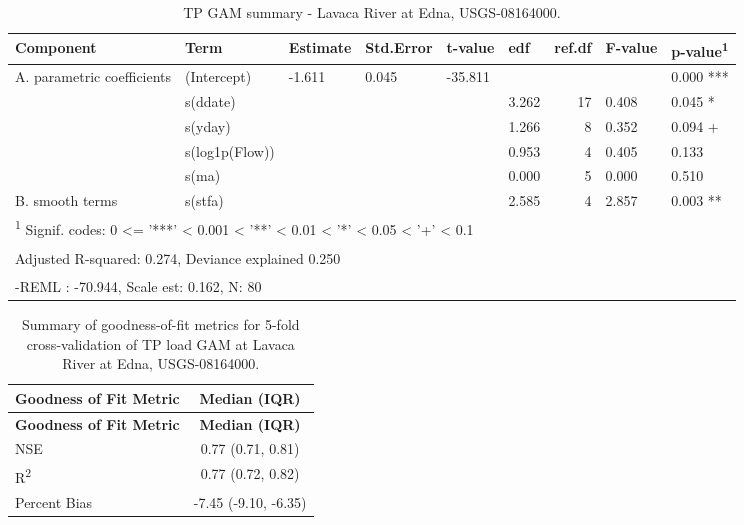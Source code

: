 \documentclass[
]{article}
\newenvironment{widestuff}{\begin{table}[h]\begin{adjustwidth}{-4.5cm}{-4.5cm}\centering}{\end{adjustwidth}\end{table}}
\begin{document}
\begin{widestuff}

\caption{TP GAM summary - Lavaca River at Edna, USGS-08164000.}
\centering
\begin{tabular}[t]{llllllrll}
\toprule
Component & Term & Estimate & Std.Error & t-value & edf & ref.df & F-value & p-value\textsuperscript{1}\\
\midrule
A. parametric coefficients & (Intercept) & -1.611 & 0.045 & -35.811 &  &  &  & 0.000 ***\\
\cmidrule{1-9}
 & s(ddate) &  &  &  & 3.262 & 17 & 0.408 & 0.045 *\\

 & s(yday) &  &  &  & 1.266 & 8 & 0.352 & 0.094 +\\

 & s(log1p(Flow)) &  &  &  & 0.953 & 4 & 0.405 & 0.133\\

 & s(ma) &  &  &  & 0.000 & 5 & 0.000 & 0.510\\

\multirow[t]{-5}{*}{\raggedright\arraybackslash B. smooth terms} & s(stfa) &  &  &  & 2.585 & 4 & 2.857 & 0.003 **\\
\bottomrule
\multicolumn{9}{l}{\textsuperscript{1} Signif. codes: 0 <= '***' < 0.001 < '**' < 0.01 < '*' < 0.05 < '+' < 0.1}\\
\multicolumn{9}{l}{\textsuperscript{} Adjusted R-squared: 0.274, Deviance explained 0.250}\\
\multicolumn{9}{l}{\textsuperscript{} -REML : -70.944, Scale est: 0.162, N: 80}\\
\end{tabular}
\end{widestuff}

\hypertarget{tbl-TP308164000-CV}{}
\begin{longtable}[]{@{}lc@{}}
\caption{\label{tbl-TP308164000-CV}Summary of goodness-of-fit metrics
for 5-fold cross-validation of TP load GAM at Lavaca River at Edna,
USGS-08164000.}\tabularnewline
\toprule()
\textbf{Goodness of Fit Metric} & \textbf{Median (IQR)} \\
\midrule()
\endfirsthead
\toprule()
\textbf{Goodness of Fit Metric} & \textbf{Median (IQR)} \\
\midrule()
\endhead
NSE & 0.77 (0.71, 0.81) \\
R\textsuperscript{2} & 0.77 (0.72, 0.82) \\
Percent Bias & -7.45 (-9.10, -6.35) \\
\bottomrule()
\end{longtable}
\end{document}
